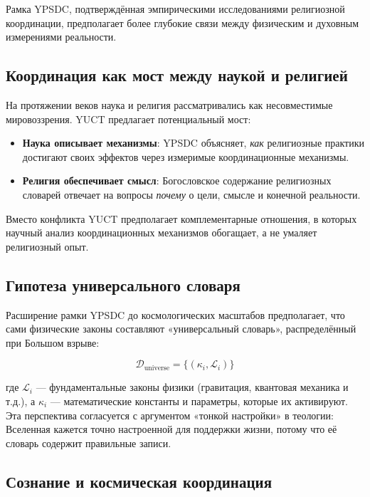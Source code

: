 \documentclass[12pt,a4paper]{article}
\begin{document}
	Рамка YPSDC, подтверждённая эмпирическими исследованиями религиозной координации, предполагает более глубокие связи между физическим и духовным измерениями реальности.
	
	\subsection{Координация как мост между наукой и религией}
	
	На протяжении веков наука и религия рассматривались как несовместимые мировоззрения. YUCT предлагает потенциальный мост:
	
	\begin{itemize}
		\item \textbf{Наука описывает механизмы}: YPSDC объясняет, \textit{как} религиозные практики достигают своих эффектов через измеримые координационные механизмы.
		
		\item \textbf{Религия обеспечивает смысл}: Богословское содержание религиозных словарей отвечает на вопросы \textit{почему} о цели, смысле и конечной реальности.
	\end{itemize}
	
	Вместо конфликта YUCT предполагает комплементарные отношения, в которых научный анализ координационных механизмов обогащает, а не умаляет религиозный опыт.
	
	\subsection{Гипотеза универсального словаря}
	
	Расширение рамки YPSDC до космологических масштабов предполагает, что сами физические законы составляют «универсальный словарь», распределённый при Большом взрыве:
	
	\[
	\mathcal{D}_{\mathrm{universe}} = \{ (\kappa_i, \mathcal{L}_i) \}
	\]
	
	где $\mathcal{L}_i$ — фундаментальные законы физики (гравитация, квантовая механика и т.д.), а $\kappa_i$ — математические константы и параметры, которые их активируют. Эта перспектива согласуется с аргументом «тонкой настройки» в теологии: Вселенная кажется точно настроенной для поддержки жизни, потому что её словарь содержит правильные записи.
	
	\subsection{Сознание и космическая координация}
	
\end{document}
